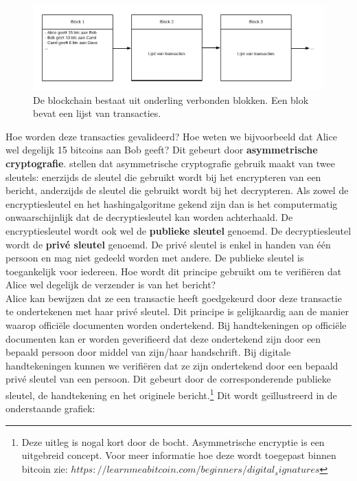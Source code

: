 \begin{figure}[h!]
	\centering
		\includegraphics[scale=0.4]{blockchain-1.png}
	\caption[Blockchain - Voorstelling 1]{De blockchain bestaat uit onderling verbonden blokken. Een blok bevat een lijst van transacties.}
	\label{blocks}
\end{figure}

Hoe worden deze transacties gevalideerd? Hoe weten we bijvoorbeeld dat Alice wel degelijk 15 bitcoins aan Bob geeft? Dit gebeurt door \textbf{asymmetrische cryptografie}. \textcite{Farah2012} stellen dat asymmetrische cryptografie gebruik maakt van twee sleutels: enerzijds de sleutel die gebruikt wordt bij het encrypteren van een bericht, anderzijds de sleutel die gebruikt wordt bij het decrypteren. Als zowel de encryptiesleutel en het hashingalgoritme gekend zijn dan is het computermatig onwaarschijnlijk dat de decryptiesleutel kan worden achterhaald. De encryptiesleutel wordt ook wel de \textbf{publieke sleutel} genoemd. De decryptiesleutel wordt de \textbf{privé sleutel} genoemd. De privé sleutel is enkel in handen van één persoon en mag niet gedeeld worden met andere. De publieke sleutel is toegankelijk voor iedereen. Hoe wordt dit principe gebruikt om te verifiëren dat Alice wel degelijk de verzender is van het bericht?\\

Alice kan bewijzen dat ze een transactie heeft goedgekeurd door deze transactie te ondertekenen met haar privé sleutel. Dit principe is gelijkaardig aan de manier waarop officiële documenten worden ondertekend. Bij handtekeningen op officiële documenten kan er worden geverifieerd dat deze ondertekend zijn door een bepaald persoon door middel van zijn/haar handschrift. Bij digitale handtekeningen kunnen we verifiëren dat ze zijn ondertekend door een bepaald privé sleutel van een persoon. Dit gebeurt door de corresponderende publieke sleutel, de handtekening en het originele bericht.\footnote{Deze uitleg is nogal kort door de bocht. Asymmetrische encryptie is een uitgebreid concept. Voor meer informatie hoe deze wordt toegepast binnen bitcoin zie: $https://learnmeabitcoin.com/beginners/digital_signatures$} Dit wordt geïllustreerd in de onderstaande grafiek:

